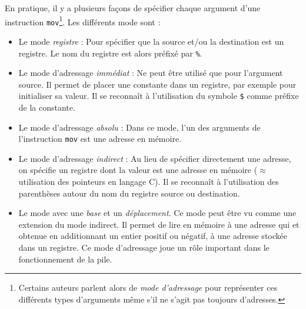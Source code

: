 En pratique, il y a plusieurs façons de spécifier chaque argument d'une instruction \texttt{mov}\footnote{Certains auteurs parlent alors de \emph{mode d'adressage} pour représenter ces différents types d'arguments même s'il ne s'agit pas toujours d'adresses.}.
Les différents mode sont :
\begin{itemize}
  \item Le mode \emph{registre} : Pour spécifier que la source et/ou la destination est un registre.
    Le nom du registre est alors préfixé par \texttt{\%}.
  \item Le mode d'adressage \emph{immédiat} : Ne peut être utilisé que pour l'argument source.
    Il permet de placer une constante dans un registre, par exemple pour initialiser sa valeur.
    Il se reconnaît à l'utilisation du symbole \texttt{\$} comme préfixe de la constante.
  \item Le mode d'adressage \emph{absolu} : Dans ce mode, l'un des arguments de l'instruction \texttt{mov} est une adresse en mémoire.
  \item Le mode d'adressage \emph{indirect} : Au lieu de spécifier directement une adresse, on spécifie un registre dont la valeur est une adresse en mémoire ($\approx$ utilisation des pointeurs en langage C).
    Il se reconnaît à l'utilisation des parenthèses autour du nom du registre source ou destination.
  \item Le mode avec une \emph{base} et un \emph{déplacement}.
    Ce mode peut être vu comme une extension du mode indirect.
    Il permet de lire en mémoire à une adresse qui et obtenue en additionnant un entier positif ou négatif, à une adresse stockée dans un registre.
    Ce mode d'adressage joue un rôle important dans le fonctionnement de la pile.
\end{itemize}

